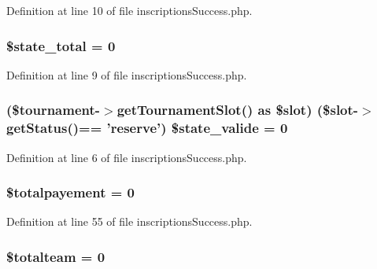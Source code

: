 Definition at line 10 of file inscriptions\-Success.\-php.

\hypertarget{inscriptions_success_8php_a344152e8335a2555919a4fdf6bfa34ca}{
\subsubsection[{\$state\-\_\-total}]{\setlength{\rightskip}{0pt plus 5cm}\$state\-\_\-total = 0}}\label{inscriptions_success_8php_a344152e8335a2555919a4fdf6bfa34ca}


Definition at line 9 of file inscriptions\-Success.\-php.

\hypertarget{inscriptions_success_8php_af3a474618823746201622a7739282918}{
\subsubsection[{\$state\-\_\-valide}]{ (\$tournament-\/$>$get\-Tournament\-Slot() as \$slot) (\$slot-\/$>$get\-Status()== 'reserve') \$state\-\_\-valide = 0}}\label{inscriptions_success_8php_af3a474618823746201622a7739282918}


Definition at line 6 of file inscriptions\-Success.\-php.

\hypertarget{inscriptions_success_8php_ae8dd4df19926f1f64c490ce1bbd42c25}{
\subsubsection[{\$totalpayement}]{\setlength{\rightskip}{0pt plus 5cm}\$totalpayement = 0}}\label{inscriptions_success_8php_ae8dd4df19926f1f64c490ce1bbd42c25}


Definition at line 55 of file inscriptions\-Success.\-php.

\hypertarget{inscriptions_success_8php_a7902d032669bb026f1c70ef34737fe9a}{
\subsubsection[{\$totalteam}]{\setlength{\rightskip}{0pt plus 5cm}\$totalteam = 0}}\label{inscriptions_success_8php_a7902d032669bb026f1c70ef34737fe9a}


